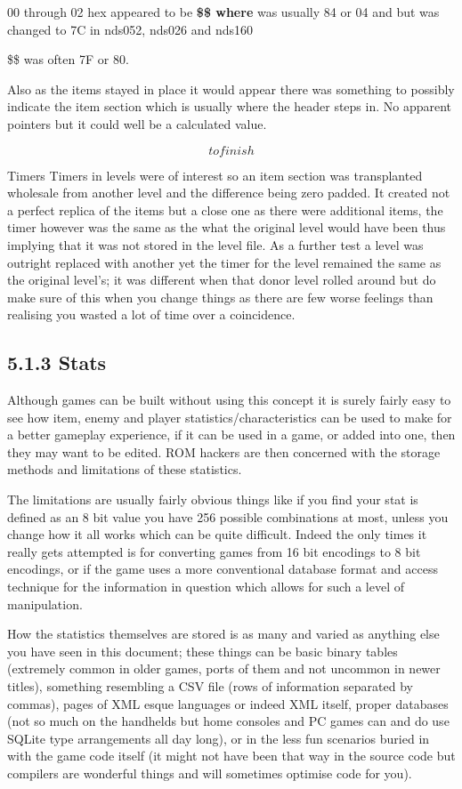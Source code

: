 \documentclass[
]{book}
\begin{document}
00 through 02 hex appeared to be \textbf{\$\$ where } was usually 84 or 04 and but was changed to 7C in nds052, nds026 and nds160

\$\$ was often 7F or 80.

Also as the items stayed in place it would appear there was something to possibly indicate the item section which is usually where the header steps in. No apparent pointers but it could well be a calculated value.

\[to finish\]

Timers Timers in levels were of interest so an item section was transplanted wholesale from another level and the difference being zero padded. It created not a perfect replica of the items but a close one as there were additional items, the timer however was the same as the what the original level would have been thus implying that it was not stored in the level file. As a further test a level was outright replaced with another yet the timer for the level remained the same as the original level's; it was different when that donor level rolled around but do make sure of this when you change things as there are few worse feelings than realising you wasted a lot of time over a coincidence.

\hypertarget{stats}{%
\subsection{5.1.3 Stats}\label{stats}}

Although games can be built without using this concept it is surely fairly easy to see how item, enemy and player statistics/characteristics can be used to make for a better gameplay experience, if it can be used in a game, or added into one, then they may want to be edited. ROM hackers are then concerned with the storage methods and limitations of these statistics.

The limitations are usually fairly obvious things like if you find your stat is defined as an 8 bit value you have 256 possible combinations at most, unless you change how it all works which can be quite difficult. Indeed the only times it really gets attempted is for converting games from 16 bit encodings to 8 bit encodings, or if the game uses a more conventional database format and access technique for the information in question which allows for such a level of manipulation.

How the statistics themselves are stored is as many and varied as anything else you have seen in this document; these things can be basic binary tables (extremely common in older games, ports of them and not uncommon in newer titles), something resembling a CSV file (rows of information separated by commas), pages of XML esque languages or indeed XML itself, proper databases (not so much on the handhelds but home consoles and PC games can and do use SQLite type arrangements all day long), or in the less fun scenarios buried in with the game code itself (it might not have been that way in the source code but compilers are wonderful things and will sometimes optimise code for you).
\end{document}
